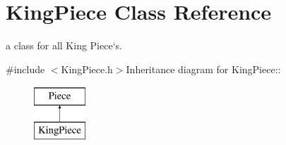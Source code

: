 \hypertarget{classKingPiece}{
\section{KingPiece Class Reference}
\label{classKingPiece}
}


a class for all King Piece`s.  


{\ttfamily \#include $<$KingPiece.h$>$}Inheritance diagram for KingPiece::\begin{figure}[H]
\begin{center}
\leavevmode
\includegraphics[height=2cm]{classKingPiece}
\end{center}
\end{figure}
